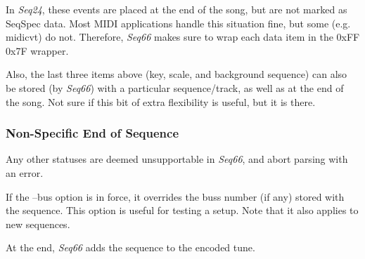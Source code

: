    In \textsl{Seq24}, these events are placed at the end of the song, but are
   not marked as SeqSpec data.  Most MIDI applications handle this situation
   fine, but some (e.g. midicvt) do not.  Therefore, \textsl{Seq66} makes
   sure to wrap each data item in the 0xFF 0x7F wrapper.

   Also, the last three items above (key, scale, and background sequence) can
   also be stored (by \textsl{Seq66}) with a particular sequence/track,
   as well as at the end of the song.  Not sure if this bit of extra
   flexibility is useful, but it is there.

\subsubsection{Non-Specific End of Sequence}
\label{subsubsec:midi_format_meta_sequence_ends}

   Any other statuses are deemed unsupportable in \textsl{Seq66}, and
   abort parsing with an error.

   If the --bus option is in force, it overrides the buss number (if any)
   stored with the sequence.  This option is useful for testing a setup.
   Note that it also applies to new sequences.

   At the end, \textsl{Seq66} adds the sequence to the encoded tune.

